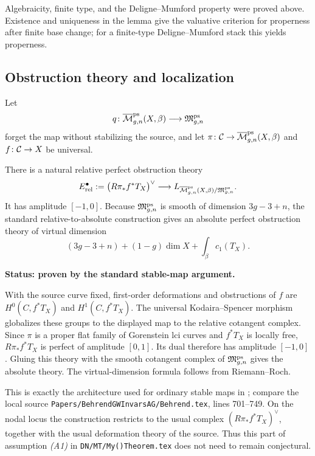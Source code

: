 \documentclass[12pt]{memoir}
\begin{document}
\begin{ptcbp}
    Algebraicity, finite type, and the Deligne--Mumford property were proved
    above.  Existence and uniqueness in the lemma give the valuative
    criterion for properness after finite base change; for a finite-type
    Deligne--Mumford stack this yields properness.
\end{ptcbp}

\subsection{Obstruction theory and localization}

Let
\[
    q\colon\overline{\mathcal{M}}^{\operatorname{\mathrm{ps}}}_{g,n}(X,\beta)\longrightarrow
    \mathfrak M^{\operatorname{\mathrm{ps}}}_{g,n}
\]
forget the map without stabilizing the source, and let
\(\pi\colon\mathcal{C}\to\overline{\mathcal{M}}^{\operatorname{\mathrm{ps}}}_{g,n}(X,\beta)\) and
\(f\colon\mathcal{C}\to X\) be universal.

\begin{Prop}
    \label{prop-ps-map-perfect-obstruction-theory}
    There is a natural relative perfect obstruction theory
    \[
        E^\bullet_{\mathrm{rel}}
        :=\bigl(R\pi_*f^*T_X\bigr)^\vee
        \longrightarrow
        L_{\overline{\mathcal{M}}^{\operatorname{\mathrm{ps}}}_{g,n}(X,\beta)/\mathfrak M^{\operatorname{\mathrm{ps}}}_{g,n}}.
    \]
    It has amplitude \([-1,0]\).  Because
    \(\mathfrak M^{\operatorname{\mathrm{ps}}}_{g,n}\) is smooth of dimension \(3g-3+n\), the
    standard relative-to-absolute construction gives an absolute perfect
    obstruction theory of virtual dimension
    \[
        (3g-3+n)+(1-g)\dim X+\int_\beta c_1(T_X).
    \]

    \noindent\textbf{Status: proven by the standard stable-map argument.}
\end{Prop}

\begin{ptcbp}
    With the source curve fixed, first-order deformations and obstructions of
    \(f\) are \(H^0(C,f^*T_X)\) and \(H^1(C,f^*T_X)\).  The universal
    Kodaira--Spencer morphism globalizes these groups to the displayed map to
    the relative cotangent complex.  Since \(\pi\) is a proper flat family of
    Gorenstein lci curves and \(f^*T_X\) is locally free,
    \(R\pi_*f^*T_X\) is perfect of amplitude \([0,1]\).  Its dual therefore
    has amplitude \([-1,0]\).  Gluing this theory with the smooth cotangent
    complex of \(\mathfrak M^{\operatorname{\mathrm{ps}}}_{g,n}\) gives the absolute theory.  The
    virtual-dimension formula follows from Riemann--Roch.

    This is exactly the architecture used for ordinary stable maps in
    \cite{BehrendGWAlgebraicGeometry}; compare the local source
    \texttt{Papers/BehrendGWInvarsAG/Behrend.tex}, lines 701--749.  On the
    nodal locus the construction restricts to the usual complex
    \((R\pi_*f^*T_X)^\vee\), together with the usual deformation theory of
    the source.  Thus this part of assumption \emph{(A1)} in
    \texttt{DN/MT/My()Theorem.tex} does not need to remain conjectural.
\end{ptcbp}
\end{document}
